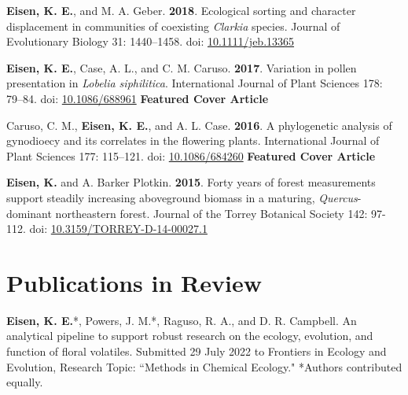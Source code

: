 \documentclass[letterpaper,11pt]{article}
\begin{document}
\begin{etaremune}
\item \textbf{Eisen, K. E.}, and M. A. Geber. \textbf{2018}. Ecological sorting and character displacement in communities of coexisting \textit{Clarkia} species. Journal of Evolutionary Biology 31: 1440–1458. doi:  \href{https://doi.org/10.1111/jeb.13365} {10.1111/jeb.13365}\\


\item \textbf{Eisen, K. E.}, Case, A. L., and C. M. Caruso. \textbf{2017}. Variation in pollen presentation in \textit{Lobelia siphilitica}. International Journal of Plant Sciences 178: 79–84. doi:  \href{https://doi.org/10.1086/688961} {10.1086/688961}  \textbf{Featured Cover Article}\\

\item Caruso, C. M., \textbf{Eisen, K. E.}, and A. L. Case. \textbf{2016}. A phylogenetic analysis of gynodioecy and its correlates in the flowering plants. International Journal of Plant Sciences 177: 115–121. doi:  \href{https://doi.org/10.1086/684260} {10.1086/684260} \textbf{Featured Cover Article}\\

\item \textbf{Eisen, K.} and A. Barker Plotkin. \textbf{2015}. Forty years of forest measurements support steadily increasing aboveground biomass in a maturing, \textit{Quercus}-dominant northeastern forest. Journal of the Torrey Botanical Society 142: 97-112. doi:  \href{https://doi.org/10.3159/TORREY-D-14-00027.1} {10.3159/TORREY-D-14-00027.1}
\end{etaremune}
\section{Publications in Review}
\begin{etaremune}
\item \textbf{Eisen, K. E.}*, Powers, J. M.*, Raguso, R. A., and D. R. Campbell. An analytical pipeline to support robust research on the ecology, evolution, and function of floral volatiles. Submitted 29 July 2022 to Frontiers in Ecology and Evolution, Research Topic: ``Methods in Chemical Ecology." *Authors contributed equally.\\

\end{etaremune}
\end{document}
